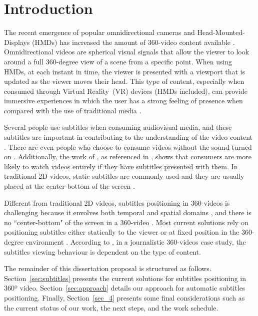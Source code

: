\section{Introduction}

The recent emergence of popular omnidirectional cameras and Head-Mounted-Displays (HMDs) has increased the amount of 360-video content available \cite{mendes_2020}. Omnidirectional videos are spherical visual signals that allow the viewer to look around a full 360-degree view of a scene from a specific point. When using HMDs, at each instant in time, the viewer is presented with a viewport that is updated as the viewer moves their head. This type of content, especially when consumed through Virtual Reality~(VR) devices (HMDs included), can provide immersive experiences in which the user has a strong feeling of presence when compared with the use of traditional media \cite{montagud_culture_2020}.

Several people use subtitles when consuming audiovisual media, and these subtitles are important in contributing to the understanding of the video content \cite{brown_subtitles_2017}. There are even people who choose to consume videos without the sound turned on \cite{hughes_disruptive_2019}. Additionally, the work of , as referenced in , shows that consumers are more likely to watch videos entirely if they have subtitles presented with them. In traditional 2D videos, static subtitles are commonly used and they are usually placed at the center-bottom of the screen \cite{rothe_dynamic_2018}.

Different from traditional 2D videos, subtitles positioning in 360-videos is challenging because it envolves both temporal and spatial domains \cite{agullo2019making}, and there is no ``center-bottom" of the screen in a 360-video \cite{brown_subtitles_2017}. Most current solutions rely on positioning subtitles either statically to the viewer or at fixed position in the 360-degree environment \cite{mendes_2020}. According to , in a journalistic 360-videos case study, the subtitles viewing behaviour is dependent on the type of content. 

The remainder of this dissertation proposal is structured as follows. Section~\ref{sec:subtitles} presents the current solutions for subtitles positioning in 360º video. Section~\ref{sec:approach} details our approach for automatic subtitles positioning. Finally, Section~\ref{sec_4} presents some final considerations such as the current status of our work, the next steps, and the work schedule.